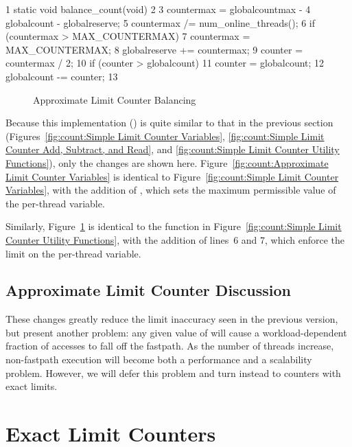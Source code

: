 { \scriptsize
\begin{verbbox}
  1 static void balance_count(void)
  2 {
  3   countermax = globalcountmax -
  4                globalcount - globalreserve;
  5   countermax /= num_online_threads();
  6   if (countermax > MAX_COUNTERMAX)
  7     countermax = MAX_COUNTERMAX;
  8   globalreserve += countermax;
  9   counter = countermax / 2;
 10   if (counter > globalcount)
 11     counter = globalcount;
 12   globalcount -= counter;
 13 }
\end{verbbox}
}
\begin{figure}[tbp]
\centering
\theverbbox
\caption{Approximate Limit Counter Balancing}
\label{fig:count:Approximate Limit Counter Balancing}
\end{figure}

Because this implementation () is quite similar to
that in the previous section
(Figures~\ref{fig:count:Simple Limit Counter Variables},
\ref{fig:count:Simple Limit Counter Add, Subtract, and Read}, and
\ref{fig:count:Simple Limit Counter Utility Functions}),
only the changes are shown here.
Figure~\ref{fig:count:Approximate Limit Counter Variables}
is identical to
Figure~\ref{fig:count:Simple Limit Counter Variables},
with the addition of , which sets the maximum
permissible value of the per-thread  variable.

Similarly,
Figure~\ref{fig:count:Approximate Limit Counter Balancing}
is identical to the  function in
Figure~\ref{fig:count:Simple Limit Counter Utility Functions},
with the addition of lines~6 and 7, which enforce the
 limit on the per-thread  variable.

\subsection{Approximate Limit Counter Discussion}

These changes greatly reduce the limit inaccuracy seen in the previous version,
but present another problem: any given value of 
will cause a workload-dependent fraction of accesses to fall off the
fastpath.
As the number of threads increase, non-fastpath execution will become both
a performance and a scalability problem.
However, we will defer this problem and turn instead to counters
with exact limits.

\section{Exact Limit Counters}
\label{sec:count:Exact Limit Counters}

